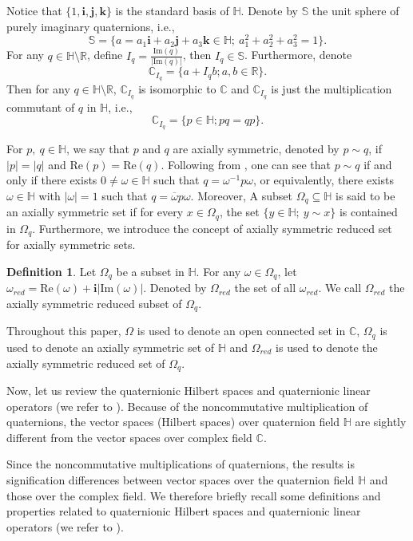 \documentclass[pdflatex,sn-mathphys-num]{sn-jnl}%
\theoremstyle{thmstyleone}%
\theoremstyle{thmstyletwo}%
\theoremstyle{thmstylethree}%
\newtheorem{definition}{Definition}%
\theoremstyle{definition}
\newtheorem{definition}[theorem]{Definition}
\theoremstyle{remark}
\begin{document}
Notice that $\{1, \boldsymbol{i}, \boldsymbol{j}, \boldsymbol{k}\}$ is the standard basis of $\mathbb{H}$.
Denote by $\mathbb{S}$ the unit sphere of purely imaginary quaternions, i.e.,
\[
\mathbb{S}=\{a=a_1\boldsymbol{i}+a_2\boldsymbol{j}+a_3\boldsymbol{k}\in\mathbb{H};\ a_1^2+a_2^2+a_3^2=1\}.
\]
For any  $q\in\mathbb{H}\setminus\mathbb{R}$, define $I_q=\frac{\mathrm{Im}(q)}{|\mathrm{Im}(q)|}$, then $I_q\in\mathbb{S}$. Furthermore,
denote
\[
\mathbb{C}_{I_q}=\{a+I_qb; a,b\in \mathbb{R}\}.
\]
Then for any  $q\in\mathbb{H}\setminus\mathbb{R}$, $\mathbb{C}_{I_q}$ is isomorphic to $\mathbb{C}$ and $\mathbb{C}_{I_q}$ is just the multiplication commutant of $q$ in $\mathbb{H}$, i.e.,
\[
\mathbb{C}_{I_q}=\{p\in\mathbb{H}; pq=qp\}.
\]

For $p,\ q\in\mathbb{H}$, we say that $p$ and $q$ are axially symmetric,  denoted by $p\sim q$, if $|p|=|q|$ and $\mathrm{Re}(p)=\mathrm{Re}(q)$. Following from \cite{CGSS, HT}, one can see that $p\sim q$ if and only if there exists $0\neq \omega\in\mathbb{H}$ such that $q=\omega^{-1}p\omega$, or equivalently, there exists $\omega\in\mathbb{H}$ with $|\omega|=1$ such that $q=\overline{\omega}p\omega$. Moreover,
A subset $\Omega_q\subseteq\mathbb{H}$ is said to be an axially symmetric set if for every $x\in\Omega_q$, the set $\{y\in\mathbb{H};\ y\sim x\}$ is contained in $\Omega_q$.
Furthermore, we introduce the concept of axially symmetric reduced set for axially symmetric sets.

\begin{definition}
    Let $\Omega_q$ be a subset in $\mathbb{H}$. For any $\omega\in\Omega_q$,
    let $\omega_{red}=\mathrm{Re}(\omega)+\boldsymbol{i}|\mathrm{Im}(\omega)|$. Denoted by $\Omega_{red}$ the set of all $\omega_{red}$. We call $\Omega_{red}$ the axially symmetric reduced subset of $\Omega_q$.
\end{definition}
Throughout this paper, $\Omega$ is used to denote an open connected set in $\mathbb{C}$, $\Omega_q$ is used to denote an axially symmetric set of $\mathbb{H}$ and $\Omega_{red}$ is used to denote the axially symmetric reduced set of $\Omega_q$.


Now, let us review the quaternionic Hilbert spaces and quaternionic linear operators (we refer to \cite{CSS}). Because of the noncommutative multiplication of quaternions, the vector spaces (Hilbert spaces) over quaternion field $\mathbb{H}$ are sightly different from the vector spaces over complex field $\mathbb{C}$.


Since the noncommutative multiplications of quaternions, the results is signification differences between vector spaces over the quaternion field
$\mathbb{H}$ and those over the complex field. We therefore briefly recall some definitions and properties related to quaternionic Hilbert spaces and quaternionic linear operators (we refer to \cite{CSS}).
\end{document}
